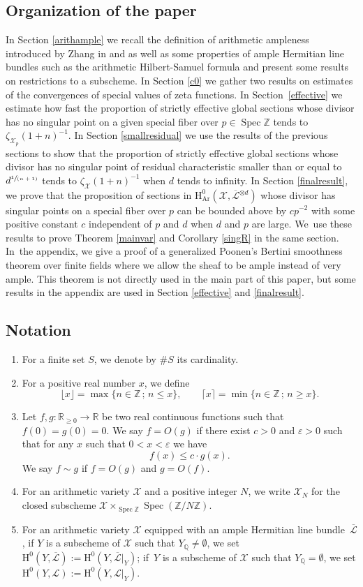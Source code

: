 \documentclass[11pt]{article}
\newcommand{\Subsection}{\subsection}
\numberwithin{equation}{section}
\newcommand{\spfrac}[2]{\sfrac{#1}{(#2)}}
\newcommand{\sep}{\,;\,}
\theoremstyle{plain}
\theoremstyle{definition}
\newcommand{\ho}{\mathrm{H}}
\newcommand{\X}{\mathcal{X}}
\newcommand{\Li}{\overline{\mathcal{L}}{}}
\newcommand{\li}{\mathcal{L}}
\newcommand{\Q}{\mathbb{Q}}
\newcommand{\Z}{\mathbb{Z}}
\newcommand{\R}{\mathbb{R}}
\DeclareMathOperator{\Spec}{Spec}
\begin{document}
\subsection{Organization of the paper}
In Section \ref{arithample} we recall the definition of arithmetic ampleness introduced by Zhang in \cite{Zh92} and \cite{Zh95} as well as some properties of ample Hermitian line bundles such as the arithmetic Hilbert-Samuel formula and present some results on restrictions to a subscheme. In Section \ref{c0} we gather two results on estimates of the convergences of special values of zeta functions. In Section~\ref{effective} we estimate how fast the proportion of strictly effective global sections whose divisor has no singular point on a given special fiber over $p\in \Spec \Z$ tends to $\zeta_{\X_p}(1+n)^{-1}$. In Section \ref{smallresidual} we use the results of the previous sections to show that the proportion of strictly effective global sections whose divisor has no singular point of residual characteristic smaller than or equal to $d^{\spfrac{1}{n+1}}$ tends to $\zeta_{\X}(1+n)^{-1}$ when $d$ tends to infinity. In Section \ref{finalresult}, we prove that the proposition of sections in $\ho^0_{\mathrm{Ar}}(\X, \Li^{\otimes d})$ whose divisor has singular points on a special fiber over $p$ can be bounded above by $cp^{-2}$ with some positive constant $c$ independent of $p$ and $d$ when $d$ and $p$ are large. We~use these results to prove Theorem \ref{mainvar} and Corollary \ref{singR} in the same section. In~the appendix, we give a proof of a generalized Poonen's Bertini smoothness theorem over finite fields where we allow the sheaf to be ample instead of very ample. This theorem is not directly used in the main part of this paper, but some results in the appendix are used in Section \ref{effective} and \ref{finalresult}.

\Subsection{Notation}
\begin{enumerate}
\item For a finite set $S$, we denote by $\#S$ its cardinality.
\item For a positive real number $x$, we define
\[
\lfloor x\rfloor= \max\{ n\in \Z\sep n\leq x \},\qquad
\lceil x\rceil = \min\{ n\in \Z\sep n\geq x \}.
\]
\item Let $f,g: \R_{\geq 0}\to \R$ be two real continuous functions such that $f(0)=g(0)=0$. We say $f=O(g)$ if there exist $c>0$ and $\varepsilon>0$ such that for any $x$ such that $0<x<\varepsilon$ we have
\[
f(x)\leq c\cdot g(x).
\]
We say $f\sim g$ if $f=O(g)$ and $g=O(f)$.
\item For an arithmetic variety $\X$ and a positive integer $N$, we write $\X_N$ for the closed subscheme $\X\times_{\Spec \Z}\Spec(\Z/N\Z)$.
\item For an arithmetic variety $\X$ equipped with an ample Hermitian line bundle~$\Li$, if $Y$ is a subscheme of $\X$ such that $Y_{\Q}\not=\emptyset$, we set $\ho^0(Y,\Li):=\ho^0(Y, \Li|_Y)$; if~$Y$ is a subscheme of $\X$ such that $Y_{\Q}=\emptyset$, we set $\ho^0(Y,\li):=\ho^0(Y, \li|_Y)$.
\end{enumerate}
\end{document}
